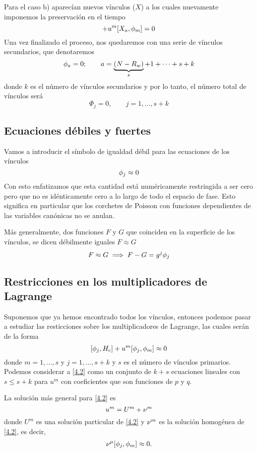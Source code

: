 Para el caso b) aparecían nuevos vínculos ($X$) a los cuales nuevamente imponemos la preservación en el tiempo
\begin{equation}
  [X_a,H_c]+u^m[X_a,\f_m]=0
\end{equation}
Una vez finalizado el proceso, nos quedaremos con una serie de vínculos secundarios, que denotaremos
\begin{equation}
  \phi_a=0;\qquad a=\underbrace{(N-R_w)}_s+1+\cdots + s+k
\end{equation}
donde $k$ es el número de vínculos secundarios y por lo tanto, el número total de vínculos será
\begin{equation}
  \Phi_j=0,\qquad j=1,...,s+k
\end{equation}

\subsection{Ecuaciones débiles y fuertes}
\begin{defi}
Vamos a introducir el símbolo de igualdad débil para las ecuaciones de los vínculos
\begin{equation}
  \phi_j\approx 0
\end{equation}
Con esto enfatizamos que esta cantidad está numéricamente restringida a ser cero pero que no es idénticamente cero a lo largo de todo el espacio de fase. Esto significa en particular que los corchetes de Poisson con funciones dependientes de las variables canónicas no se anulan.

Más generalmente, dos funciones $F$ y $G$ que coinciden en la superficie de los vínculos, se dicen débilmente iguales $F\approx G$
\begin{equation}
  F\approx G\implies F-G=g^j\phi_j
\end{equation}
\end{defi}

\subsection{Restricciones en los multiplicadores de Lagrange}
Suponemos que ya hemos encontrado todos los vínculos, entonces podemos pasar a estudiar las resticciones sobre los multiplicadores de Lagrange, las cuales serán de la forma
\begin{equation}\label{4.2}
  [\phi_j,H_c]+u^m[\phi_j,\phi_m]\approx 0
\end{equation}
donde $m=1,...,s$ y $j=1,...,s+k$ y $s$ es el número de vínculos primarios. Podemos considerar a \eqref{4.2} como un conjunto de $k+s$ ecuaciones lineales con $s\leq s+k$ para $u^m$ con coeficientes que son funciones de $p$ y $q$.

La solución más general para \eqref{4.2} es 
\begin{equation}
  u^m=U^m+\nu^m
\end{equation}
donde $U^m$ es una solución particular de \eqref{4.2} y $\nu^m $ es la solución homogénea de \eqref{4.2}, es decir,
\begin{equation}
  \nu^\mu [\phi_j,\phi_m]\approx 0.
\end{equation}














